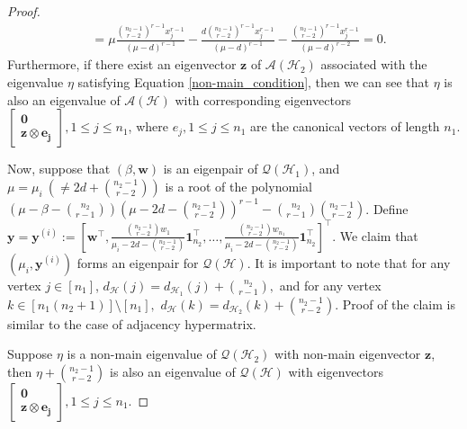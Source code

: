 \documentclass[10pt,a4paper]{article}
\begin{document}
\begin{proof}
\begin{align*}
			&= \mu \frac{\binom{n_2-1}{r-2}^{r-1} x_j^{r-1}}{(\mu-d)^{r-1}}- \frac{d\binom{n_2-1}{r-2}^{r-1} x_j^{r-1}}{(\mu-d)^{r-1}} - \frac{\binom{n_2-1}{r-2}^{r-1} x_j^{r-1}}{(\mu-d)^{r-2}} = 0.
		\end{align*}
		Furthermore, if there exist an eigenvector $\mathbf{z}$ of $\mathcal{A}(\mathcal{H}_2)$ associated with the eigenvalue $\eta$ satisfying Equation \ref{non-main_condition}, then we can see that $\eta$ is also an eigenvalue of $\mathcal{A}(\mathcal{H})$ with corresponding eigenvectors $\left[\begin{matrix}
			\mathbf{0} \\ \mathbf{z} \otimes \mathbf{e_j} 
		\end{matrix}\right], 1 \leq j \leq n_1$, where $e_j, 1 \leq j \leq n_1$ are the canonical vectors of length $n_1$.  
		
		Now, suppose that $(\beta, \mathbf{w})$ is an eigenpair of $\mathcal{Q}(\mathcal{H}_1)$, and $\mu = \mu_i~ ( \neq 2d+\binom{n_2-1}{r-2} )$ is a root of the polynomial \\ $\left( \mu-\beta-\binom{n_2}{r-1} \right)\left( \mu-2d-\binom{n_2-1}{r-2} \right)^{r-1}-\binom{n_2}{r-1} \binom{n_2-1}{r-2}$. Define $\mathbf{y}=\mathbf{y}^{(i)} := \left[ \mathbf{w}^\intercal, \frac{\binom{n_2-1}{r-2}w_1}{\mu_i-2d-\binom{n_2-1}{r-2}}\mathbf{1}_{n_2}^{\intercal}, \ldots , \frac{\binom{n_2-1}{r-2}w_{n_1}}{\mu_i-2d-\binom{n_2-1}{r-2} }\mathbf{1}_{n_2}^{\intercal} \right]^\intercal$. We claim that $(\mu_i, \mathbf{y}^{(i)})$ forms an eigenpair for $\mathcal{Q}(\mathcal{H})$.
		It is important to note that for any vertex $j \in [n_1]$,  $d_{\mathcal{H}}(j) = d_{\mathcal{H}_1}(j) + \binom{n_2}{r-1},$ and for any vertex $k \in [n_1(n_2+1)] \setminus [n_1],$ $d_{\mathcal{H}}(k)= d_{\mathcal{H}_2}(k) + \binom{n_2-1}{r-2}.$ 
		Proof of the claim is similar to the case of adjacency hypermatrix.
		
		\noindent Suppose $\eta$ is a non-main eigenvalue of $\mathcal{Q}(\mathcal{H}_2)$ with non-main eigenvector $\mathbf{z}$, then $\eta+\binom{n_2-1}{r-2}$ is also an eigenvalue of $\mathcal{Q}(\mathcal{H})$ with eigenvectors
		$\left[\begin{matrix}
			\mathbf{0} \\ \mathbf{z} \otimes \mathbf{e_j} 
		\end{matrix}\right], 1 \leq j \leq n_1.$
	\end{proof}
	
	
	
	
	
	
	
\end{document}
